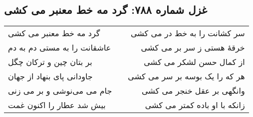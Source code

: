 \begin{center}
\section*{غزل شماره ۷۸۸: گرد مه خط معنبر می کشی}
\label{sec:788}
\begin{longtable}{l p{0.5cm} r}
گرد مه خط معنبر می کشی
&&
سر کشانت را به خط در می کشی
\\
عاشقانت را به مستی دم به دم
&&
خرقهٔ هستی ز سر بر می کشی
\\
بر بتان چین و ترکان چگل
&&
از کمال حسن لشکر می کشی
\\
جاودانی پای بنهاد از جهان
&&
هر که را یک بوسه بر سر می کشی
\\
جام می می‌نوشی و بر می زنی
&&
وانگهی بر عقل خنجر می کشی
\\
بیش شد عطار را اکنون غمت
&&
زانکه با او باده کمتر می کشی
\\
\end{longtable}
\end{center}
